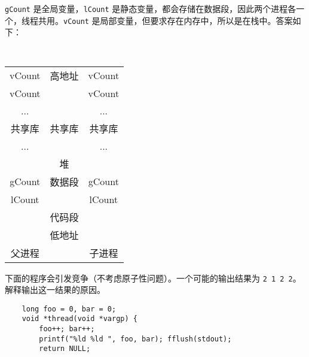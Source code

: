 \begin{problems}
\begin{verbatim}
        \end{verbatim}
        \sol \verb|gCount| 是全局变量，\verb|lCount| 是静态变量，都会存储在数据段，因此两个进程各一个，线程共用。\verb|vCount| 是局部变量，但要求存在内存中，所以是在栈中。答案如下：
        \begin{table}[H]
            \tt
            \centering
            \begin{tabular}{ccc}
                \cline{1-1} \cline{3-3}
                \multicolumn{1}{|c|}{vCount} & \multicolumn{1}{c|}{高地址} & \multicolumn{1}{c|}{vCount} \\
                \multicolumn{1}{|c|}{vCount} & \multicolumn{1}{c|}{} & \multicolumn{1}{c|}{vCount} \\ \cline{1-1} \cline{3-3} 
                \multicolumn{1}{|c|}{...} & \multicolumn{1}{c|}{} & \multicolumn{1}{c|}{...} \\ \cline{1-1} \cline{3-3} 
                \multicolumn{1}{|c|}{共享库} & \multicolumn{1}{c|}{共享库} & \multicolumn{1}{c|}{共享库} \\ \cline{1-1} \cline{3-3} 
                \multicolumn{1}{|c|}{...} & \multicolumn{1}{c|}{} & \multicolumn{1}{c|}{...} \\ \cline{1-1} \cline{3-3} 
                \multicolumn{1}{|c|}{} & \multicolumn{1}{c|}{堆} & \multicolumn{1}{c|}{} \\ \cline{1-1} \cline{3-3} 
                \multicolumn{1}{|c|}{gCount} & \multicolumn{1}{c|}{数据段} & \multicolumn{1}{c|}{gCount} \\
                \multicolumn{1}{|c|}{lCount} & \multicolumn{1}{c|}{} & \multicolumn{1}{c|}{lCount} \\ \cline{1-1} \cline{3-3} 
                \multicolumn{1}{|c|}{} & \multicolumn{1}{c|}{代码段} & \multicolumn{1}{c|}{} \\ \cline{1-1} \cline{3-3} 
                \multicolumn{1}{|c|}{} & \multicolumn{1}{c|}{低地址} & \multicolumn{1}{c|}{} \\ \cline{1-1} \cline{3-3} 
                父进程 &  & 子进程
            \end{tabular}
        \end{table}
        \pro 下面的程序会引发竞争（不考虑原子性问题）。一个可能的输出结果为 \verb|2 1 2 2|。解释输出这一结果的原因。
        \begin{verbatim}
    long foo = 0, bar = 0;
    void *thread(void *vargp) {
        foo++; bar++;
        printf("%ld %ld ", foo, bar); fflush(stdout);
        return NULL;

\end{verbatim}
\end{problems}
